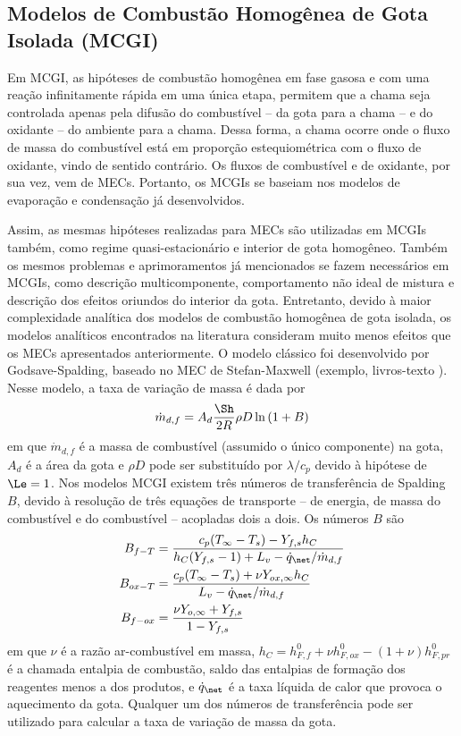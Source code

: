 \subsection{Modelos de Combustão Homogênea de Gota Isolada (MCGI)} \label{sec:MCGI}

Em MCGI, as hipóteses de combustão homogênea em fase gasosa e com uma reação infinitamente rápida em uma única etapa, permitem que a chama seja controlada apenas pela difusão do combustível -- da gota para a chama -- e do oxidante -- do ambiente para a chama.
Dessa forma, a chama ocorre onde o fluxo de massa do combustível está em proporção estequiométrica com o fluxo de oxidante, vindo de sentido contrário. 
Os fluxos de combustível e de oxidante, por sua vez, vem de MECs.
Portanto, os MCGIs se baseiam nos modelos de evaporação e condensação já desenvolvidos.

Assim, as mesmas hipóteses realizadas para MECs são utilizadas em MCGIs também, como regime quasi-estacionário e interior de gota homogêneo.
Também os mesmos problemas e aprimoramentos já mencionados se fazem necessários em MCGIs, como descrição multicomponente, comportamento não ideal de mistura e  
descrição dos efeitos oriundos do interior da gota.
Entretanto, devido à maior complexidade analítica dos modelos de combustão homogênea de gota isolada, os modelos analíticos encontrados na literatura consideram muito menos efeitos que os MECs apresentados anteriormente.
O modelo clássico foi desenvolvido por Godsave-Spalding, baseado no MEC de Stefan-Maxwell (exemplo, livros-texto \cite{Glassman2008,Law2006,Turns2000}).
Nesse modelo, a taxa de variação de massa é dada por
\begin{equation}
    \dot m_{d,f} = A_d \frac{\Sh}{2R} \rho D \ln{(1 + B)} \label{eq:m_evap_B_M_2}
\end{equation}
em que $\dot m_{d,f}$ é a massa de combustível (assumido o único componente) na gota, $A_d$ é a área da gota e $\rho D$ pode ser substituído por $\lambda/c_p$ devido à hipótese de $\Le=1$.
Nos modelos MCGI existem três números de transferência de Spalding $B$, devido à resolução de três equações de transporte -- de energia, de massa do combustível e do combustível -- acopladas dois a dois.
Os números $B$ são
\begin{align}
    B_{f-T}  &= \frac{c_p(T_\infty - T_s) - Y_{f,s} h_C}{h_C(Y_{f,s} - 1) + L_v - \dot q_{\net}/\dot m_{d,f}} \label{eq:B_fq}\\
    B_{ox-T} &= \frac{c_p(T_\infty - T_s) + \nu Y_{ox,\infty}h_C}{L_v  - \dot q_{\net}/\dot m_{d,f}} \label{eq:B_oq}\\
    B_{f-ox} &= \frac{\nu Y_{o,\infty} + Y_{f,s}}{1 - Y_{f,s}} \label{eq:B_fo}
\end{align}
em que $\nu$ é a razão ar-combustível em massa, $h_C=h^0_{F,f} + \nu h^0_{F,ox} - (1+\nu)h^0_{F,pr}$ é a chamada entalpia de combustão, saldo das entalpias de formação dos reagentes menos a dos produtos, e $\dot q_\net$ é a taxa líquida de calor que provoca o aquecimento da gota.
Qualquer um dos números de transferência pode ser utilizado para calcular a taxa de variação de massa da gota.

